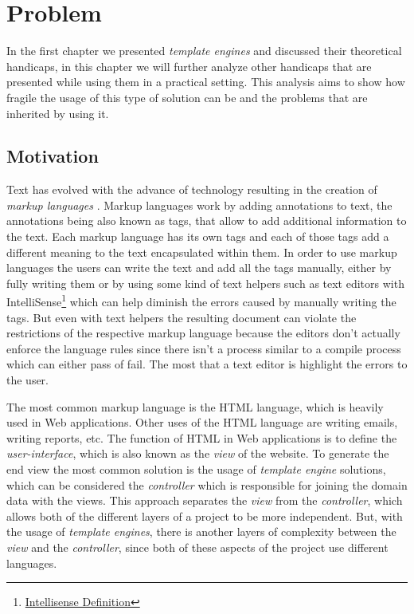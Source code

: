\chapter{Problem}
\label{cha:problem}

\sloppy

In the first chapter we presented \textit{template engines} and discussed their theoretical handicaps, in this chapter we will further analyze other handicaps that are presented while using them in a practical setting. This analysis aims to show how fragile the usage of this type of solution can be and the problems that are inherited by using it.

\section{Motivation}
\label{sec:motivation}

Text has evolved with the advance of technology resulting in the creation of \textit{markup languages} \cite{markuplanguages}. Markup languages work by adding annotations to text, the annotations being also known as tags, that allow to add additional information to the text. Each markup language has its own tags and each of those tags add a different meaning to the text encapsulated within them. In order to use markup languages the users can write the text and add all the tags manually, either by fully writing them or by using some kind of text helpers such as text editors with IntelliSense\footnote{\href{https://www.techopedia.com/definition/24580/intellisense}{Intellisense Definition}} which can help diminish the errors caused by manually writing the tags. But even with text helpers the resulting document can violate the restrictions of the respective markup language because the editors don't actually enforce the language rules since there isn't a process similar to a compile process which can either pass of fail. The most that a text editor is highlight the errors to the user.

\noindent
The most common markup language is the \ac{HTML} language, which is heavily used in Web applications. Other uses of the \ac{HTML} language are writing emails, writing reports, etc. The function of \ac{HTML} in Web applications is to define the \textit{user-interface}, which is also known as the \textit{view} of the website. To generate the end view the most common solution is the usage of \textit{template engine}  solutions, which can be considered the \textit{controller} which is responsible for joining the domain data with the views. This approach separates the \textit{view} from the \textit{controller}, which allows both of the different layers of a project to be more independent. But, with the usage of \textit{template engines}, there is another layers of complexity between the \textit{view} and the \textit{controller}, since both of these aspects of the project use different languages. 

